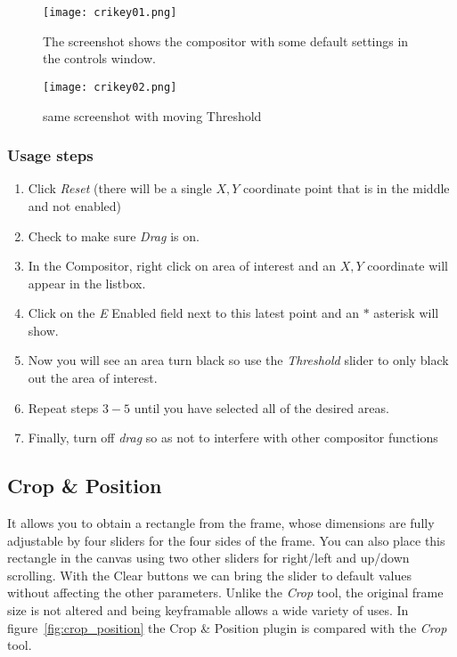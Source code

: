 \begin{figure}[htpb]
    \centering
    \texttt{[image: crikey01.png]}
    \caption{The screenshot shows the compositor with some default settings in the controls window.}
    \label{fig:crikey01}
\end{figure}

\begin{figure}[htpb]
    \centering
    \texttt{[image: crikey02.png]}
    \caption{same screenshot with moving Threshold}
    \label{fig:crikey02}
\end{figure}

\subsubsection*{Usage steps}
\label{ssub:usage_steps}

\begin{enumerate}
    \item Click \textit{Reset} (there will be a single $X,Y$ coordinate point that is in the middle and not enabled)
    \item Check to make sure \textit{Drag} is on.
    \item In the Compositor, right click on area of interest and an $X,Y$ coordinate will appear in the listbox.
    \item Click on the \textit{E} Enabled field next to this latest point and an $*$ asterisk will show.
    \item Now you will see an area turn black so use the \textit{Threshold} slider to only black out the area of interest.
    \item Repeat steps $3-5$ until you have selected all of the desired areas.
    \item Finally, turn off \textit{drag} so as not to interfere with other compositor functions
\end{enumerate}

\subsection{Crop \& Position}%
\label{sub:crop_position}

It allows you to obtain a rectangle from the frame, whose dimensions are fully adjustable by four sliders for the four sides of the frame. You can also place this rectangle in the canvas using two other sliders for right/left and up/down scrolling. With the Clear buttons we can bring the slider to default values without affecting the other parameters. Unlike the \textit{Crop} tool, the original frame size is not altered and being keyframable allows a wide variety of uses. In figure~\ref{fig:crop_position} the Crop \& Position plugin is compared with the \textit{Crop} tool.

